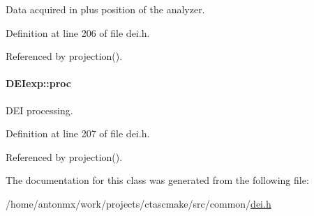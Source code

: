 Data acquired in plus position of the analyzer. 



Definition at line 206 of file dei.h.



Referenced by projection().

\hypertarget{classDEIexp_a735b9b8675b0bec7511edee60caac2af}{
\paragraph[{proc}]{ {\bf DEIexp::proc}}\hfill}
\label{classDEIexp_a735b9b8675b0bec7511edee60caac2af}


DEI processing. 



Definition at line 207 of file dei.h.



Referenced by projection().



The documentation for this class was generated from the following file:\begin{DoxyCompactItemize}
\item 
/home/antonmx/work/projects/ctascmake/src/common/\hyperlink{dei_8h}{dei.h}\end{DoxyCompactItemize}
